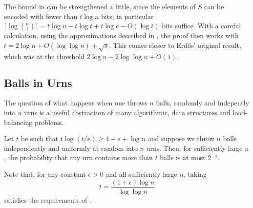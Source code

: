 \documentclass[lotsofwhite]{patmorin}
\begin{document}
\begin{rem}
The bound in  can be strengthened a little,
since the elements of $S$ can be encoded with fewer than $t\log n$
bits; in particular $\lceil\log\binom{n}{t}\rceil=t\log n - t\log t +
t\log e - O(\log t)$ bits suffice.  With a careful calculation, using
the approximations described in , the
proof then works with $t=2\log n +O(\log\log n) + \sqrt{s}$. This comes
closer to Erdős' original result, which was at the threshold $2\log n -
2\log\log n + O(1)$.
\end{rem}



\subsection{Balls in Urns}

The question of what happens when one throws $n$ balls, randomly and
indepently into $n$ urns is a useful abstraction of many algorithmic,
data structures and load-balancing problems.

\begin{thm}
  Let $t$ be such that $t\log(t/e) \ge 4+s+\log n$ and suppose we throw
  $n$ balls independently and uniformly at random into $n$ urns. Then,
  for sufficiently large $n$, the probability that any urn contains more 
  than $t$ balls is at most $2^{-s}$.
\end{thm}

Note that, for any constant $\epsilon >0$ and all sufficiently large
$n$, taking 
\[
   t = \frac{(1+\epsilon)\log n}{\log\log n}
\] 
satisfies the requirements of .
\end{document}
